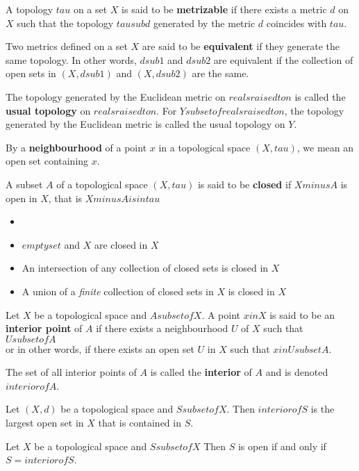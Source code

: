 \begin{defn}
A topology $tau$ on a set $X$ is said to be \textbf{metrizable} if there exists a metric $d$ on $X$ such that the topology $tau sub d$ generated by the metric $d$ coincides with $tau$.
\end{defn}

\begin{defn}
Two metrics defined on a set $X$ are said to be \textbf{equivalent} if they generate the same topology. 
In other words, $d sub 1$ and $d sub 2$ are equivalent if the collection of open sets in $(X, d sub 1)$ and $(X, d sub 2)$ are the same.
\end{defn}

\begin{defn}
The topology generated by the Euclidean metric on $reals raised to n$ is called the \textbf{usual topology} on $reals raised to n$.
For $Y subset of reals raised to n$, the topology generated by the Euclidean metric is called the usual topology on $Y$.
\end{defn}

\begin{defn}
By a \textbf{neighbourhood} of a point $x$ in a topological space $(X, tau)$, we mean an open set containing $x$.
\end{defn}

\begin{defn}
A subset $A$ of a topological space $(X, tau)$ is said to be \textbf{closed} if $X minus A$ is open in $X$, that is $X minus A is in tau$
\end{defn}

\begin{prop}
    \begin{itemize}
        \item[]
        \item  $empty set$ and $X$ are closed in $X$
        \item An intersection of any collection of closed sets is closed in $X$
        \item A union of a \textit{finite} collection of closed sets in $X$ is closed in $X$
    \end{itemize}
\end{prop}

\begin{defn}
Let $X$ be a topological space and $A subset of X$. A point $x in X$ is said to be an \textbf{interior point} of $A$ if there exists a neighbourhood $U$ of $X$ such that $U subset of A$\\ or in other words, if there exists an open set $U$ in $X$ such that $x in U subset A$. 

The set of all interior points of $A$ is called the \textbf{interior} of $A$ and is denoted $interior of A$.
\end{defn}

\begin{thm}
    Let $(X, d)$ be a topological space and $S subset of X$. Then $interior of S$ is the largest open set in $X$ that is contained in $S$.
\end{thm}

\begin{thm}
    Let $X$ be a topological space and $S subset of X$ Then $S$ is open if and only if $S = interior of S$.
\end{thm}
